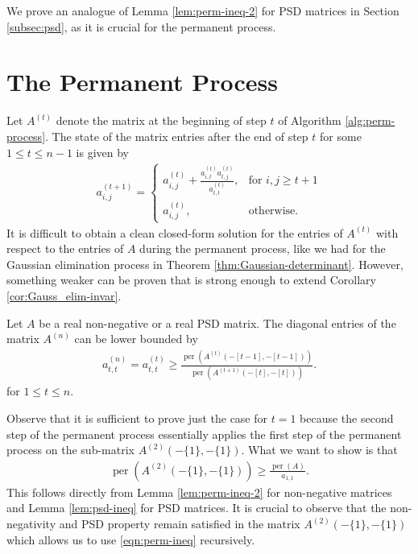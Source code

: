 \documentclass[11pt]{article}
\makeatletter
\theoremstyle{definition}
\newenvironment{proof}[1][\protect\proofname]{\par
	\normalfont\topsep6\p@\@plus6\p@\relax
	\trivlist
	\itemindent\parindent        %
	\item[\hskip\labelsep\scshape #1]\ignorespaces
}{%
	\endtrivlist\@endpefalse
}
\providecommand{\proofname}{Proof}
\DeclareMathOperator{\per}{per}
\makeatother
\begin{document}
\begin{remark}
    We prove an analogue of Lemma \ref{lem:perm-ineq-2} for PSD matrices in Section \ref{subsec:psd}, as it is crucial for the permanent process.
\end{remark}
\section{The Permanent Process}
\label{sec:perm-process}
Let $A^{(t)}$ denote the matrix at the beginning of step $t$ of Algorithm \ref{alg:perm-process}. The state of the matrix entries after the end of step $t$ for some $1\leq t\leq n-1$ is given by 
\begin{align}
	\label{eqn:perm-process}
	a_{i,j}^{(t+1)}=\begin{cases} a_{i,j}^{(t)}+\frac{a_{i,t}^{(t)}a_{t,j}^{(t)}}{a_{t,t}^{(t)}}  , &\text{for $i,j\geq t+1$}\\
		a_{i,j}^{(t)}, &\text{otherwise.}
	\end{cases}
\end{align}
It is difficult to obtain a clean closed-form solution for the entries of $A^{(t)}$ with respect to the entries of $A$ during the permanent process, like we had for the Gaussian elimination process in Theorem \ref{thm:Gaussian-determinant}. However, something weaker can be proven that is strong enough to extend Corollary \ref{cor:Gauss_elim-invar}. 
\begin{theorem}
	\label{thm:perm_process-invar}
	Let $A$ be a real non-negative or a real PSD matrix. The diagonal entries of the matrix $A^{(n)}$ can be lower bounded by 
	\begin{align*}
		a_{t,t}^{(n)}=a_{t,t}^{(t)}\geq \frac{\per(A^{(t)}(-[t-1], -[t-1]))}{\per(A^{(t+1)}(-[t], -[t]))}.
	\end{align*}
	for $1\leq t\leq n$.
\end{theorem}
\begin{proof}
	Observe that it is sufficient to prove just the case for $t=1$ because the second step of the permanent process essentially applies the first step of the permanent process on the sub-matrix $A^{(2)}(-\{1\}, -\{1\})$. What we want to show is that 
	\begin{align}
		\label{eqn:perm-ineq}
		\per(A^{(2)}(-\{1\}, -\{1\}))  \geq \frac{\per(A)}{a_{1,1}}.
	\end{align}
	This  follows directly from Lemma \ref{lem:perm-ineq-2} for non-negative matrices and Lemma \ref{lem:psd-ineq} for PSD matrices. It is crucial to observe that the non-negativity and PSD property remain satisfied in the matrix $A^{(2)}(-\{1\}, -\{1\})$ which allows us to use \eqref{eqn:perm-ineq} recursively. 
\end{proof}
\end{document}
